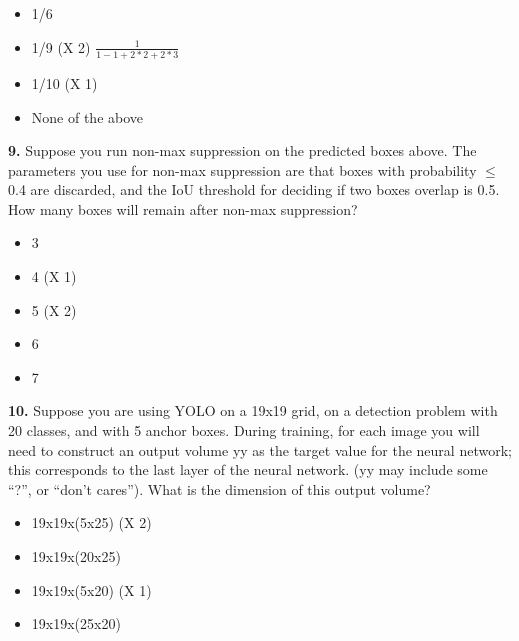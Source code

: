 \begin{itemize}
    \item 1/6
    \item 1/9 (X 2) $\frac{1}{1-1+2*2+2*3}$
    \item 1/10 (X 1)
    \item None of the above
\end{itemize}
\textbf{9.} Suppose you run non-max suppression on the predicted boxes above. The parameters you use for non-max suppression are that boxes with probability $\leq$ 0.4 are discarded, and the IoU threshold for deciding if two boxes overlap is 0.5. How many boxes will remain after non-max suppression?
\begin{itemize}
    \item 3
    \item 4 (X 1)
    \item 5 (X 2)
    \item 6
    \item 7
\end{itemize}
\textbf{10.} Suppose you are using YOLO on a 19x19 grid, on a detection problem with 20 classes, and with 5 anchor boxes. During training, for each image you will need to construct an output volume yy as the target value for the neural network; this corresponds to the last layer of the neural network. (yy may include some “?”, or “don’t cares”). What is the dimension of this output volume?
\begin{itemize}
    \item 19x19x(5x25) (X 2)
    \item 19x19x(20x25)
    \item 19x19x(5x20) (X 1)
    \item 19x19x(25x20)
\end{itemize}